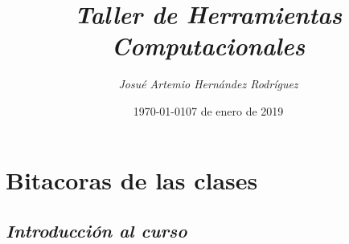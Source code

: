 \documentclass{book}
\title{\textit{Taller de Herramientas Computacionales}}
\author{\textit{Josué Artemio Hernández Rodríguez}}
\date{\today}
\begin{document}
	\maketitle
	\tableofcontents
	



\chapter{Bitacoras de las clases}



\section{\textit{Introducción al curso}}%
\begin{flushright}
	\date{07 de enero de 2019}
\end{flushright}
\end{document}
